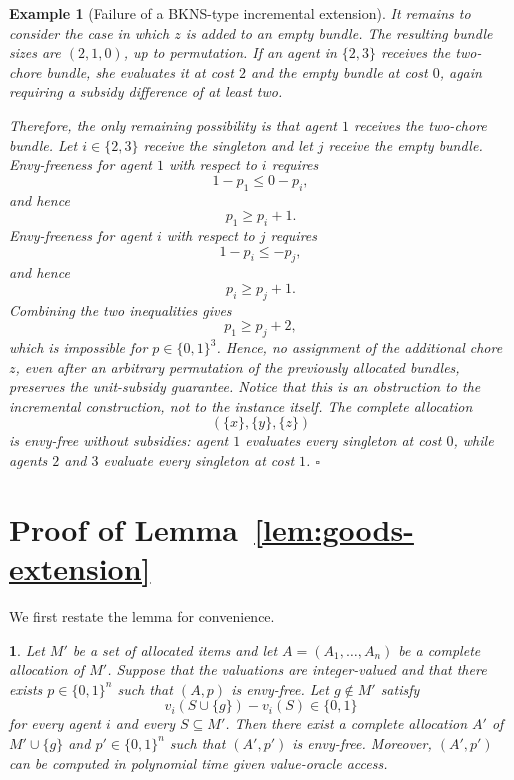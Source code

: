 \documentclass[11pt]{article}
\theoremstyle{plain}
\newtheorem{example}{Example}
\theoremstyle{plain}
\newcommand{\restatedname}{}
\newtheorem*{restated}{\restatedname}
\begin{document}
\begin{example}[Failure of a BKNS-type incremental extension]
It remains to consider the case in which $z$ is added to an empty bundle. The resulting bundle sizes are $(2,1,0)$, up to permutation. If an agent in $\{2,3\}$ receives the two-chore bundle, she evaluates it at cost $2$ and the empty bundle at cost $0$, again requiring a subsidy difference of at least two.

Therefore, the only remaining possibility is that agent $1$ receives the two-chore bundle. Let $i\in\{2,3\}$ receive the singleton and let $j$ receive the empty bundle. Envy-freeness for agent $1$ with respect to $i$ requires
\[
1-p_1\le 0-p_i,
\]
and hence
\[
p_1\ge p_i+1.
\]
Envy-freeness for agent $i$ with respect to $j$ requires \[
1-p_i\le -p_j,
\] and hence
\[
p_i\ge p_j+1.
\] Combining the two inequalities gives
\[
p_1\ge p_j+2,
\] which is impossible for $p\in\{0,1\}^3$. Hence, no assignment of the additional chore $z$, even after an arbitrary permutation of the previously allocated bundles, preserves the unit-subsidy guarantee. Notice that this is an obstruction to the incremental construction, not to the instance itself. The complete allocation
\[
(\{x\},\{y\},\{z\})
\] is envy-free without subsidies: agent $1$ evaluates every singleton at cost $0$, while agents $2$ and $3$ evaluate every singleton at cost $1$. \hfill $\square$
\end{example}



\section{Proof of \texorpdfstring{Lemma~\ref{lem:goods-extension}}{the one-good extension lemma}}
\label{app:goods-extension}
We first restate the lemma for convenience.
\renewcommand{\restatedname}{Lemma~\ref{lem:goods-extension}}
\begin{restated}
Let $M'$ be a set of allocated items and let $A=(A_1,\ldots,A_n)$ be a complete allocation of $M'$. Suppose that the valuations are integer-valued and that there exists $p\in\{0,1\}^n$ such that $(A,p)$ is envy-free. Let $g\notin M'$ satisfy
\[
v_i(S\cup\{g\})-v_i(S)\in\{0,1\}
\]
for every agent $i$ and every $S\subseteq M'$. Then there exist a complete allocation $A'$ of $M'\cup\{g\}$ and $p'\in\{0,1\}^n$ such that $(A',p')$ is envy-free. Moreover, $(A',p')$ can be computed in polynomial time given value-oracle access.
\end{restated}
\end{document}

